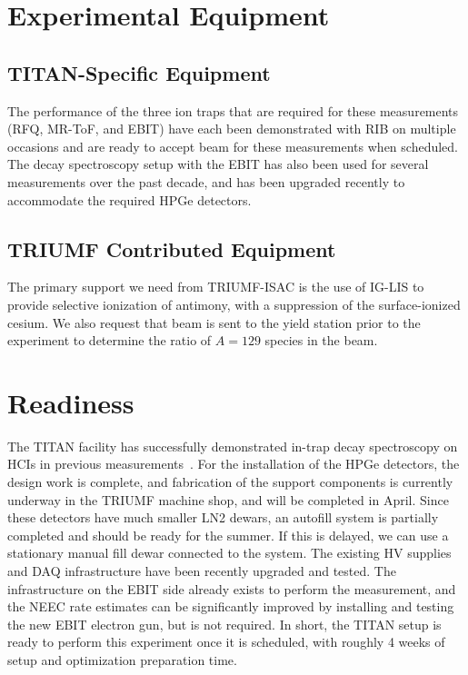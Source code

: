\documentclass[12pt]{article}
\begin{document}

\section{Experimental Equipment}
\subsection{TITAN-Specific Equipment}
The performance of the three ion traps that are required for these measurements (RFQ, MR-ToF, and EBIT) have each been demonstrated with RIB on multiple occasions and are ready to accept beam for these measurements when scheduled.  The decay spectroscopy setup with the EBIT has also been used for several measurements over the past decade, and has been upgraded recently to accommodate the required HPGe detectors.

\subsection{TRIUMF Contributed Equipment}
The primary support we need from TRIUMF-ISAC is the use of IG-LIS to provide selective ionization of antimony, with a suppression of the surface-ionized cesium.  We also request that beam is sent to the yield station prior to the experiment to determine the ratio of $A=129$ species in the beam.

\section{Readiness}
The TITAN facility has successfully demonstrated in-trap decay spectroscopy on HCIs in previous measurements~\cite{Len14,Lea15b}.  For the installation of the HPGe detectors, the design work is complete, and fabrication of the support components is currently underway in the TRIUMF machine shop, and will be completed in April.  Since these detectors have much smaller LN2 dewars, an autofill system is partially completed and should be ready for the summer.  If this is delayed, we can use a stationary manual fill dewar connected to the system.  The existing HV supplies and DAQ infrastructure have been recently upgraded and tested.  The infrastructure on the EBIT side already exists to perform the measurement, and the NEEC rate estimates can be significantly improved by installing and testing the new EBIT electron gun, but is not required.  In short, the TITAN setup is ready to perform this experiment once it is scheduled, with roughly 4 weeks of setup and optimization preparation time.
\end{document}

